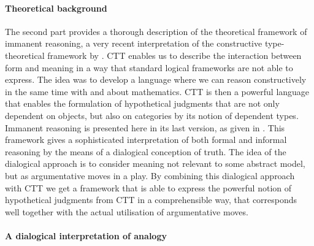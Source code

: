         \paragraph{Theoretical background}
        	
        The second part provides a thorough description of the theoretical framework of immanent reasoning, a very recent interpretation of the constructive type-theoretical framework by \textcite{martin1984intuitionistic}. CTT enables us to describe the interaction between form and  meaning in a way that standard logical frameworks are not able to express. The idea was to develop a language where we can reason constructively in the same time with and about mathematics. CTT is then a powerful language that enables the formulation of hypothetical judgments that are not only dependent on objects, but also on categories by its notion of dependent types. Immanent reasoning is presented here in its last version, as given in \textcite{rahman18}. This framework gives a sophisticated interpretation of both formal and informal reasoning by the means of a dialogical conception of truth. The idea of the dialogical approach is to consider meaning not relevant to some abstract model, but as argumentative moves in a play. By combining this dialogical approach with CTT we get a framework that is able to express the powerful notion of hypothetical judgments from CTT in a comprehensible way, that corresponds well together with the actual utilisation of argumentative moves. 
        
        \paragraph{A dialogical interpretation of analogy}
        
